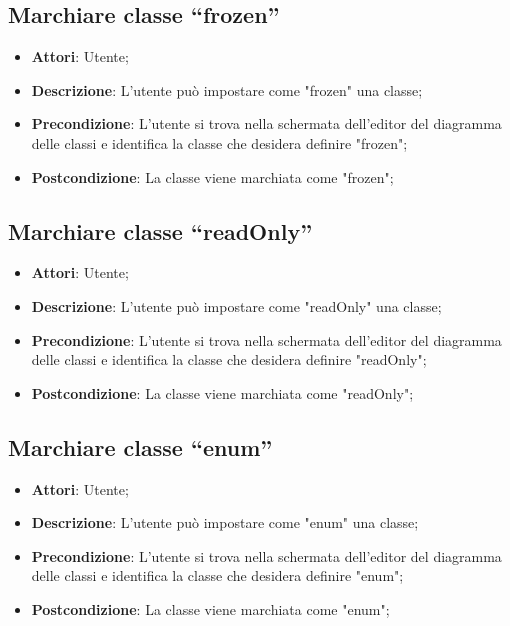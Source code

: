 \documentclass[../AnalisiDeiRequisiti.tex]{subfiles}
\begin{document}
			\subsection{Marchiare classe “frozen”}
			\begin{itemize}
				\item \textbf{Attori}: Utente;
				\item \textbf{Descrizione}: L'utente può impostare come "frozen" una classe;
				\item \textbf{Precondizione}: L’utente si trova nella schermata dell'editor del diagramma delle classi e identifica la classe che desidera definire "frozen";
				\item \textbf{Postcondizione}: La classe viene marchiata come "frozen";
			\end{itemize}
			
			\subsection{Marchiare classe “readOnly”}
			\begin{itemize}
				\item \textbf{Attori}: Utente;
				\item \textbf{Descrizione}: L'utente può impostare come "readOnly" una classe;
				\item \textbf{Precondizione}: L’utente si trova nella schermata dell'editor del diagramma delle classi e identifica la classe che desidera definire "readOnly";
				\item \textbf{Postcondizione}: La classe viene marchiata come "readOnly";
			\end{itemize}
			
			\subsection{Marchiare classe “enum”}
			\begin{itemize}
				\item \textbf{Attori}: Utente;
				\item \textbf{Descrizione}: L'utente può impostare come "enum" una classe;
				\item \textbf{Precondizione}: L’utente si trova nella schermata dell'editor del diagramma delle classi e identifica la classe che desidera definire "enum";
				\item \textbf{Postcondizione}: La classe viene marchiata come "enum";
			\end{itemize}
			
\end{document}
